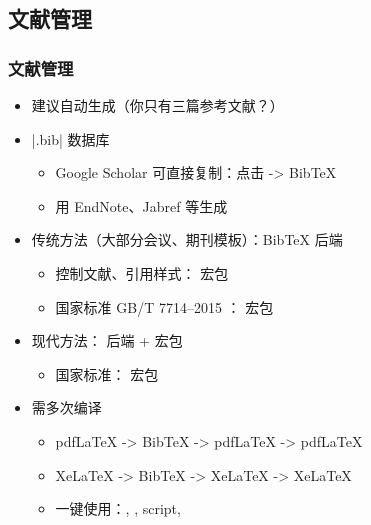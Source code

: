 \subsection{文献管理}
\begin{frame}[fragile]
  \frametitle{文献管理}
  \begin{itemize}
    \item 建议自动生成\pause （你只有三篇参考文献？）\pause
    \item |.bib| 数据库
  
      \begin{itemize}
        \item Google Scholar 可直接复制：点击 \faQuoteRight \quad -> Bib\TeX{}
        \item 用 EndNote、Jabref 等生成
      \end{itemize} \pause
  
    \item 传统方法（大部分会议、期刊模板）：Bib\TeX{}  后端
  
      \begin{itemize}
        \item 控制文献、引用样式： 宏包
        \item 国家标准 GB/T 7714--2015
              ：
              \alert{ 宏包}
      \end{itemize} \pause
  
    \item 现代方法： 后端 +  宏包
  
      \begin{itemize}
        \item 国家标准： 宏包
      \end{itemize} \pause
  
    \item 需多次编译
      \begin{itemize}
        \item pdf\LaTeX{} -> Bib\TeX{} -> pdf\LaTeX{} -> pdf\LaTeX{}
        \item Xe\LaTeX{} -> Bib\TeX{} -> Xe\LaTeX{} -> Xe\LaTeX{}
        \item 一键使用：, ,  script, 
      \end{itemize}
    
  \end{itemize}
\end{frame}

